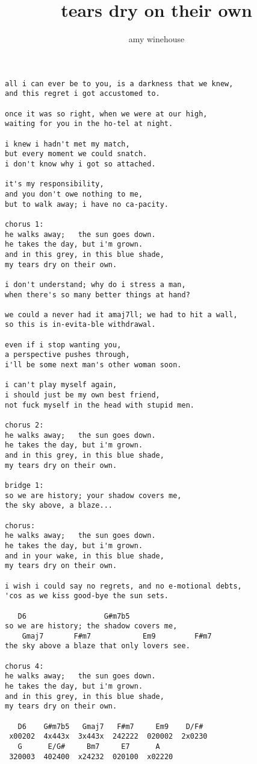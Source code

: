 \author{amy winehouse}
\title{tears dry on their own}
\maketitle
\begin{verbatim}   
all i can ever be to you, is a darkness that we knew,
and this regret i got accustomed to.

once it was so right, when we were at our high,
waiting for you in the ho-tel at night.

i knew i hadn't met my match,
but every moment we could snatch.
i don't know why i got so attached.

it's my responsibility,
and you don't owe nothing to me,
but to walk away; i have no ca-pacity.

chorus 1:
he walks away;   the sun goes down.
he takes the day, but i'm grown.
and in this grey, in this blue shade,
my tears dry on their own.

i don't understand; why do i stress a man,
when there's so many better things at hand?

we could a never had it amaj7ll; we had to hit a wall,
so this is in-evita-ble withdrawal.

even if i stop wanting you,
a perspective pushes through,
i'll be some next man's other woman soon.

i can't play myself again,
i should just be my own best friend,
not fuck myself in the head with stupid men.

chorus 2:
he walks away;   the sun goes down.
he takes the day, but i'm grown.
and in this grey, in this blue shade,
my tears dry on their own.

bridge 1:
so we are history; your shadow covers me,
the sky above, a blaze...

chorus:
he walks away;   the sun goes down.
he takes the day, but i'm grown.
and in your wake, in this blue shade,
my tears dry on their own.

i wish i could say no regrets, and no e-motional debts,
'cos as we kiss good-bye the sun sets.

   D6                  G#m7b5
so we are history; the shadow covers me,
    Gmaj7       F#m7            Em9         F#m7
the sky above a blaze that only lovers see.

chorus 4:
he walks away;   the sun goes down.
he takes the day, but i'm grown.
and in this grey, in this blue shade,
my tears dry on their own.

   D6    G#m7b5   Gmaj7   F#m7     Em9    D/F#
 x00202  4x443x  3x443x  242222  020002  2x0230
   G      E/G#     Bm7     E7      A
 320003  402400  x24232  020100  x02220
\end{verbatim}
